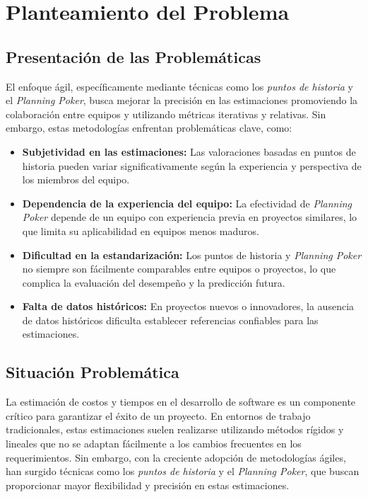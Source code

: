 \chapter{Planteamiento del Problema}
\section{Presentación de las Problemáticas}

El enfoque ágil, específicamente mediante técnicas como los \textit{puntos de historia} y el \textit{Planning Poker}, busca mejorar la precisión en las estimaciones promoviendo la colaboración entre equipos y utilizando métricas iterativas y relativas. Sin embargo, estas metodologías enfrentan problemáticas clave, como:

\begin{itemize}
    \item \textbf{Subjetividad en las estimaciones:} Las valoraciones basadas en puntos de historia pueden variar significativamente según la experiencia y perspectiva de los miembros del equipo.
    \item \textbf{Dependencia de la experiencia del equipo:} La efectividad de \textit{Planning Poker} depende de un equipo con experiencia previa en proyectos similares, lo que limita su aplicabilidad en equipos menos maduros.
    \item \textbf{Dificultad en la estandarización:} Los puntos de historia y \textit{Planning Poker} no siempre son fácilmente comparables entre equipos o proyectos, lo que complica la evaluación del desempeño y la predicción futura.
    \item \textbf{Falta de datos históricos:} En proyectos nuevos o innovadores, la ausencia de datos históricos dificulta establecer referencias confiables para las estimaciones.
\end{itemize}


\section{Situación Problemática}

La estimación de costos y tiempos en el desarrollo de software es un componente crítico para garantizar el éxito de un proyecto. En entornos de trabajo tradicionales, estas estimaciones suelen realizarse utilizando métodos rígidos y lineales que no se adaptan fácilmente a los cambios frecuentes en los requerimientos. Sin embargo, con la creciente adopción de metodologías ágiles, han surgido técnicas como los \textit{puntos de historia} y el \textit{Planning Poker}, que buscan proporcionar mayor flexibilidad y precisión en estas estimaciones.

